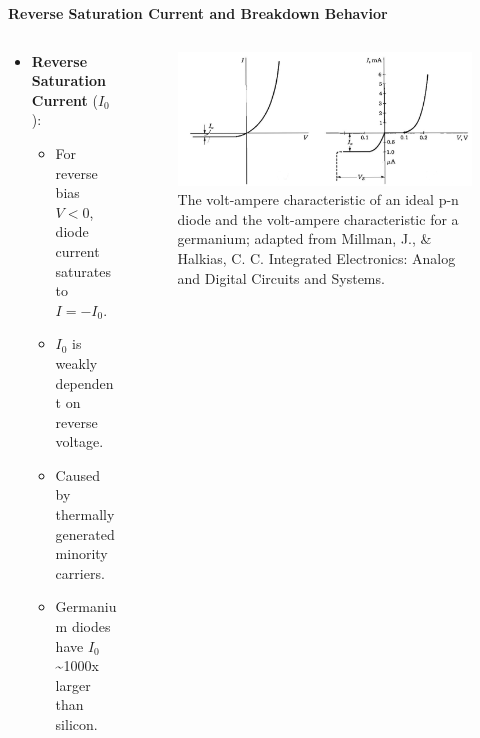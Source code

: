 \begin{frame}{\textbf{Reverse Saturation Current and Breakdown Behavior}}
	\begin{columns}
		\begin{column}{0.25\textwidth}
    	\begin{itemize}
        \item \textbf{Reverse Saturation Current} ($I_0$):
        \begin{itemize}
            \item For reverse bias $V < 0$, diode current saturates to $I = -I_0$.
            \item $I_0$ is weakly dependent on reverse voltage.
            \item Caused by thermally generated minority carriers.
            \item Germanium diodes have $I_0$ \textasciitilde{}1000x larger than silicon.
        \end{itemize}
	\end{itemize}
		\end{column}
		\begin{column}{0.75\textwidth}
	\begin{figure}
		\centering
		\includegraphics[scale=0.25]{fig/lec03/VI_characteristics.png}
		\caption{The volt-ampere characteristic of an ideal p-n diode and the volt-ampere characteristic for a germanium; adapted from Millman, J., \& Halkias, C. C. Integrated Electronics: Analog and Digital Circuits and Systems.}
		\label{fig:diode_characteristics}
	\end{figure}
	\end{column}
	\end{columns}
\end{frame}

